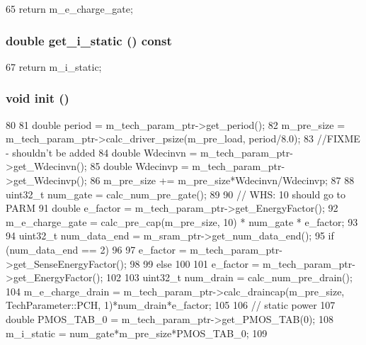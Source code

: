 \begin{DoxyCode}
65 { return m_e_charge_gate; }
\end{DoxyCode}
\hypertarget{classPrechargeUnit_af4ce13e52cccc034f4f0bb0f0a6c9468}{
\subsubsection[{get\_\-i\_\-static}]{\setlength{\rightskip}{0pt plus 5cm}double get\_\-i\_\-static () const}}
\label{classPrechargeUnit_af4ce13e52cccc034f4f0bb0f0a6c9468}



\begin{DoxyCode}
67 { return m_i_static; }
\end{DoxyCode}
\hypertarget{classPrechargeUnit_a02fd73d861ef2e4aabb38c0c9ff82947}{
\subsubsection[{init}]{\setlength{\rightskip}{0pt plus 5cm}void init ()}}
\label{classPrechargeUnit_a02fd73d861ef2e4aabb38c0c9ff82947}



\begin{DoxyCode}
80 {
81     double period = m_tech_param_ptr->get_period();
82     m_pre_size = m_tech_param_ptr->calc_driver_psize(m_pre_load, period/8.0);
83     //FIXME - shouldn't be added
84     double Wdecinvn = m_tech_param_ptr->get_Wdecinvn();
85     double Wdecinvp = m_tech_param_ptr->get_Wdecinvp();
86     m_pre_size += m_pre_size*Wdecinvn/Wdecinvp;
87 
88     uint32_t num_gate = calc_num_pre_gate();
89 
90     // WHS: 10 should go to PARM 
91     double e_factor = m_tech_param_ptr->get_EnergyFactor();
92     m_e_charge_gate = calc_pre_cap(m_pre_size, 10) * num_gate * e_factor;
93 
94     uint32_t num_data_end = m_sram_ptr->get_num_data_end();
95     if (num_data_end == 2)
96     {
97         e_factor = m_tech_param_ptr->get_SenseEnergyFactor();
98     }
99     else
100     {
101         e_factor = m_tech_param_ptr->get_EnergyFactor();
102     }
103     uint32_t num_drain = calc_num_pre_drain();
104     m_e_charge_drain = m_tech_param_ptr->calc_draincap(m_pre_size, 
      TechParameter::PCH, 1)*num_drain*e_factor;
105 
106     // static power
107     double PMOS_TAB_0 = m_tech_param_ptr->get_PMOS_TAB(0);
108     m_i_static = num_gate*m_pre_size*PMOS_TAB_0;
109 }
\end{DoxyCode}


